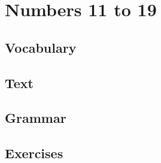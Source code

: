 \chapter{Numbers 11 to 19}
\section*{Vocabulary}
\section*{Text}
\section*{Grammar}
\section*{Exercises}
